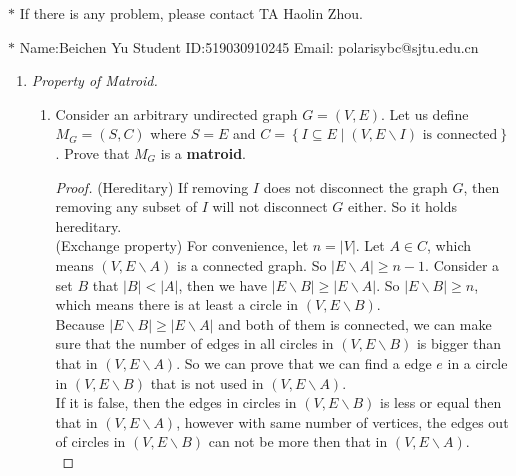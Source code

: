 \documentclass[12pt,a4paper]{article}
\theoremstyle{definition}
\begin{document}
\noindent

\noindent{}
\begin{center}
\footnotesize{\color{red}$*$ If there is any problem, please contact TA Haolin Zhou.}

\footnotesize{\color{blue}$*$ Name:Beichen Yu  \quad Student ID:519030910245 \quad Email: polarisybc@sjtu.edu.cn}
\end{center}

\begin{enumerate}
\item \textit{Property of Matroid.} 
\begin{enumerate}
	\item
	Consider an arbitrary undirected graph $ G=(V,E) $. Let us define $ M_{G}=(S,C) $ where $ S=E $ and $ C=\left\{I \subseteq E \mid\left(V, E \backslash I\right) \text { is connected}\right\} $. Prove that $ M_{G} $ is a \textbf{matroid}.\par
	    \begin{proof}
	    	(Hereditary) If removing $I$ does not disconnect the graph $G$, then removing any subset of $I$ will not disconnect $G$ either. So it holds hereditary.\\
	    	
	    	(Exchange property) For convenience, let $n=|V|$. Let $A \in C$, which means $(V,E \backslash A)$ is a connected graph. So $|E\backslash A| \geqslant n-1$. Consider a set $B$ that $|B|<|A|$, then we have $|E\backslash B| \geqslant |E\backslash A|$. So $|E\backslash B| \geqslant n$, which means there is at least a circle in $(V,E \backslash B)$. \\
	    	
	    	Because $|E\backslash B| \geqslant |E\backslash A|$ and both of them is connected, we can make sure that the number of edges in all circles in $(V,E \backslash B)$ is bigger than that in $(V,E \backslash A)$. So we can prove that we can find a edge $e$ in a circle in $(V,E \backslash B)$ that is not used in $(V,E \backslash A)$. \\
	    	
	    	If it is false, then the edges in circles in $(V,E \backslash B)$ is less or equal then that in $(V,E \backslash A)$, however with same number of vertices, the edges out of circles in $(V,E \backslash B)$ can not be more then that in $(V,E \backslash A)$.\\
	    	

\end{proof}
\end{enumerate}
\end{enumerate}
\end{document}
